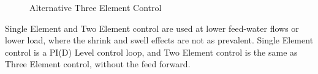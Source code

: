         \begin{figure}[ht]
            \begin{center}
                \caption{Alternative Three Element Control \cite{crossco}}
                \label{fig:Alt_3_element_control}
            \end{center}
        \end{figure}



        
        Single Element and Two Element control are used at lower feed-water flows or lower load, where the shrink and swell effects are not as prevalent. Single Element control is a PI(D) Level control loop, and Two Element control is the same as Three Element control, without the feed forward.
        

